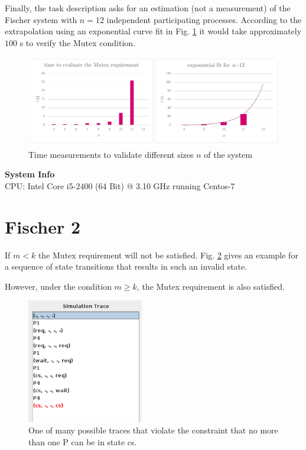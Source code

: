 \documentclass[10pt,bibliography=totocnumbered,listof=totocnumbered, footsepline, headsepline]{scrreprt}
\begin{document}
Finally, the task description asks for an estimation (not a measurement) of the Fischer system with $n=12$ independent participating processes.
According to the extrapolation using an exponential curve fit in Fig. \ref{fig:fisher_2_plot} it would take approximately $100$ s to verify the Mutex condition.


\begin{figure}[H]
	\centerline{\includegraphics[width=38pc]{fischer_2_plot.pdf}}
	\caption{Time measurements to validate different sizes $n$ of the system}
	\label{fig:fisher_2_plot}
\end{figure}

\textbf{System Info}\\

CPU: Intel Core i5-2400 (64 Bit) @ 3.10 GHz running Centos-7



\section{Fischer 2}

If $m<k$ the Mutex requirement will not be satisfied.
Fig. \ref{fig:Fisher_2_violation_trace} gives an example for a sequence of state transitions that results in such an invalid state.

However, under the condition $m \geq k$, the Mutex requirement is also satisfied.

\begin{figure}[H]
	\centerline{\includegraphics[width=12pc]{Fisher_2_violation_trace.png}}
	\caption{One of many possible traces that violate the constraint that no more than one P can be in state cs.}
	\label{fig:Fisher_2_violation_trace}
\end{figure}
\end{document}
